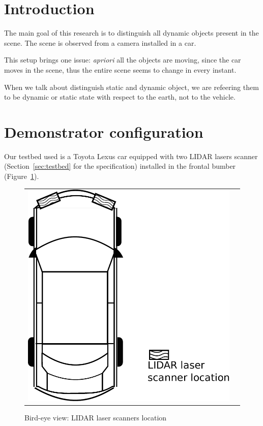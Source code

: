 
\section{Introduction}

The main goal of this research is to distinguish all dynamic objects present in the scene. The scene is observed from a camera installed in a car.

This setup brings one issue: \textit{apriori} all the objects are moving, since the car moves in the scene, thus the entire scene seems to change in every instant. 

When we talk about distinguish static and dynamic object, we are refeering them to be dynamic or static state with respect to the earth, not to the vehicle.

\section{Demonstrator configuration} %
\label{sec:demonstrator}

Our testbed used is a Toyota Lexus car equipped with two LIDAR lasers scanner (Section~\ref{sec:testbed} for the specification) installed in the frontal bumber (Figure~\ref{fig:demonstrator:birdeye}).

\begin{figure}[h]
   \centering
     \begin{tabular}{lr}
       \includegraphics[scale=0.4]{img/fig:demonstrator:birdeye}
     \end{tabular}
   \caption{Bird-eye view: LIDAR laser scanners location}
   \label{fig:demonstrator:birdeye}
\end{figure}

